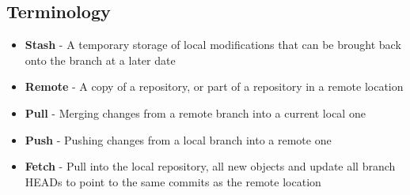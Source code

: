 \subsection{Terminology}
\begin{itemize}
\item\textbf{Stash} - A temporary storage of local modifications that can be brought back onto the branch at a later date
\item\textbf{Remote} - A copy of a repository, or part of a repository in a remote location
\item\textbf{Pull} - Merging changes from a remote branch into a current local one
\item\textbf{Push} - Pushing changes from a local branch into a remote one
\item\textbf{Fetch} - Pull into the local repository, all new objects and update all branch HEADs to point to the same commits as the remote location
\end{itemize}
